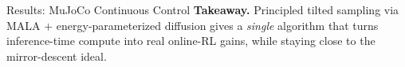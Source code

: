\documentclass[final,hyperref={pdfpagelabels=false}]{beamer}
\newlength{\colwidth}
\begin{document}
\begin{frame}[t]
\begin{columns}[t]
\begin{column}{\colwidth}
\begin{block}{\Large Results: MuJoCo Continuous Control}
\vspace{0.3em}
\textbf{Takeaway.} Principled tilted sampling via MALA $+$ energy-parameterized
diffusion gives a \emph{single} algorithm that turns inference-time compute into
real online-RL gains, while staying close to the mirror-descent ideal.
\end{block}

\end{column}

\end{columns}

\end{frame}
\end{document}
